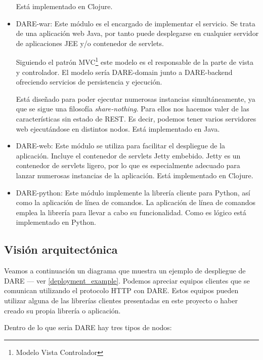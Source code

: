 \begin{itemize}
    Está implementado en Clojure.

  \item DARE-war: Este módulo es el encargado de implementar el
    servicio. Se trata de una aplicación web Java, por tanto puede
    desplegarse en cualquier servidor de aplicaciones JEE y/o
    contenedor de servlets.

    Siguiendo el patrón MVC\footnote{Modelo Vista Controlador} este
    modelo es el responsable de la parte de vista y controlador. El
    modelo sería DARE-domain junto a DARE-backend ofreciendo servicios
    de persistencia y ejecución.

    Está diseñado para poder ejecutar numerosas instancias
    simultáneamente, ya que se sigue una filosofía
    \emph{share-nothing}. Para ellos nos hacemos valer de las
    características sin estado de REST. Es decir, podemos tener varios
    servidores web ejecutándose en distintos nodos. Está implementado
    en Java.

  \item DARE-web: Este módulo se utiliza para facilitar el despliegue
    de la aplicación. Incluye el contenedor de servlets
    Jetty\cite{JETTY} embebido. Jetty es un contenedor de servlets
    ligero, por lo que es especialmente adecuado para lanzar numerosas
    instancias de la aplicación. Está implementado en Clojure.

  \item DARE-python: Este módulo implemente la librería cliente para
    Python, así como la aplicación de línea de comandos. La aplicación
    de línea de comandos emplea la librería para llevar a cabo su
    funcionalidad. Como es lógico está implementado en Python.

\end{itemize}

\subsection{Visión arquitectónica}

Veamos a continuación un diagrama que muestra un ejemplo de despliegue
de DARE --- ver \ref{deployment_example}. Podemos apreciar equipos clientes que se comunican utilizando
el protocolo HTTP con DARE. Estos equipos pueden utilizar alguna de
las librerías clientes presentadas en este proyecto o haber creado su
propia librería o aplicación.

Dentro de lo que seria DARE hay tres tipos de nodos:

